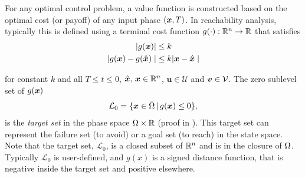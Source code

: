 For any optimal control problem, a value function is constructed based on the optimal cost (or payoff) of any input phase $(\bm{x}, T)$.  In reachability analysis, typically this is defined using a terminal cost function $g(\cdot): \mathbb{R}^n \rightarrow \mathbb{R}$ that satisfies 
\begin{subequations}
	\begin{align}
		| g(\bm{x}) | &\le k \\
		| g(\bm{x}) - g(\hat{\bm{x}}) \mid &\le k | \bm{x} - \hat{\bm{x}} \mid
	\end{align}
\end{subequations}

%
%
for constant $k$ and all 
$T \le t \le 0$, $\hat{\bm{x}}, \, \bm{x} \in \mathbb{R}^n$, $\bm{u}\in \mathcal{U}$ and $\bm{v} \in \mathcal{V}$.  The zero sublevel set of $g(\bm{x})$ \ie
%
\begin{align}
	\mathcal{L}_0 = \{ \state \in \bar{\Omega} \,|\, g(\state) \le 0 \},
	\label{eq:target_set}
\end{align}
%
is the \textit{target set} in the phase space $\Omega \times \mathbb{R}$ (proof in \citet{Mitchell2005}). This target set can represent the failure set (to avoid) or a goal set (to reach) in the state space. Note that the target set, $\mathcal{L}_0$, is a closed subset of $\mathbb{R}^n$ and is in the closure of $\Omega$. Typically $\mathcal{L}_0$ is user-defined, and $g(x)$ is a signed distance function, that is negative inside the target set and positive elsewhere.

